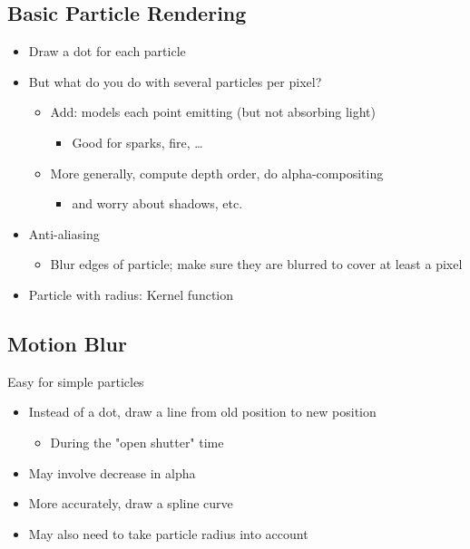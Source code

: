 \documentclass{article}
\begin{document}
\subsection*{Basic Particle Rendering}
\begin{itemize}
    \item Draw a dot for each particle
    \item But what do you do with several particles per pixel?
    \begin{itemize}
        \item Add: models each point emitting (but not absorbing light)
        \begin{itemize}
            \item Good for sparks, fire, \dots
        \end{itemize}
        \item More generally, compute depth order, do alpha-compositing
        \begin{itemize}
            \item and worry about shadows, etc.
        \end{itemize}
    \end{itemize}
    \item Anti-aliasing
    \begin{itemize}
        \item Blur edges of particle; make sure they are blurred to cover at least a pixel
    \end{itemize}
    \item Particle with radius: Kernel function
\end{itemize}

\subsection*{Motion Blur}
Easy for simple particles
\begin{itemize}
    \item Instead of a dot, draw a line from old position to new position
    \begin{itemize}
        \item During the "open shutter" time
    \end{itemize}
    \item May involve decrease in alpha
    \item More accurately, draw a spline curve
    \item May also need to take particle radius into account
\end{itemize}
\end{document}
